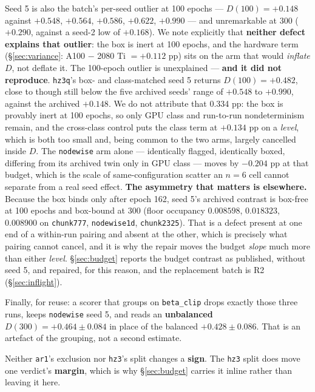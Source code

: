 \documentclass[10pt,letterpaper]{article}
\newcommand{\Dstat}{D}                         %
\newcommand{\arm}[1]{\texttt{#1}}
\begin{document}
Seed 5 is also the batch's per-seed outlier at 100 epochs --- $\Dstat(100) = \mathbf{+0.148}$
against $\mathbf{+0.548}$, $\mathbf{+0.564}$, $\mathbf{+0.586}$, $\mathbf{+0.622}$,
$\mathbf{+0.990}$ --- and unremarkable at 300 ($+0.290$, against a seed-2 low of $+0.168$). We note
explicitly that \textbf{neither defect explains that outlier}: the box is inert at 100 epochs, and
the hardware term (\S\ref{sec:variance}: A100 $-$ 2080 Ti $= +0.112$ pp) sits on the arm that would
\emph{inflate} $\Dstat$, not deflate it. The 100-epoch outlier is unexplained --- \textbf{and it
did not reproduce}. \arm{hz3q}'s box- and class-matched seed 5 returns
$\Dstat(100) = \mathbf{+0.482}$, close to though still below the five archived seeds' range of
$+0.548$ to $+0.990$, against the archived $\mathbf{+0.148}$. We do not attribute that 0.334 pp:
the box is provably inert at 100 epochs, so only GPU class and run-to-run nondeterminism remain,
and the cross-class control puts the class term at $+0.134$ pp on a \emph{level}, which is both too
small and, being common to the two arms, largely cancelled inside $\Dstat$. The \arm{nodewise} arm
alone --- identically flagged, identically boxed, differing from its archived twin only in GPU
class --- moves by $-0.204$ pp at that budget, which is the scale of same-configuration scatter an
$n = 6$ cell cannot separate from a real seed effect. \textbf{The asymmetry that matters is
elsewhere.} Because the box binds only after epoch 162, seed 5's archived contrast is box-free at
100 epochs and box-bound at 300 (floor occupancy $0.008598$, $0.018323$, $0.008900$ on
\arm{chunk777}, \arm{nodewise1d}, \arm{chunk2325}). That is a defect present at one end of a
within-run pairing and absent at the other, which is precisely what pairing cannot cancel, and it
is why the repair moves the budget \emph{slope} much more than either \emph{level}. \S\ref{sec:budget}
reports the budget contrast as published, without seed 5, and repaired, for this reason, and the
replacement batch is R2 (\S\ref{sec:inflight}).

Finally, for reuse: a scorer that groups on \texttt{beta\_clip} drops exactly those three runs,
keeps \arm{nodewise} seed 5, and reads an \textbf{unbalanced} $\Dstat(300) = +0.464 \pm 0.084$ in
place of the balanced $+0.428 \pm 0.086$. That is an artefact of the grouping, not a second
estimate.

Neither \arm{ar1}'s exclusion nor \arm{hz3}'s split changes a \textbf{sign}. The \arm{hz3} split
does move one verdict's \textbf{margin}, which is why \S\ref{sec:budget} carries it inline rather
than leaving it here.
\end{document}
